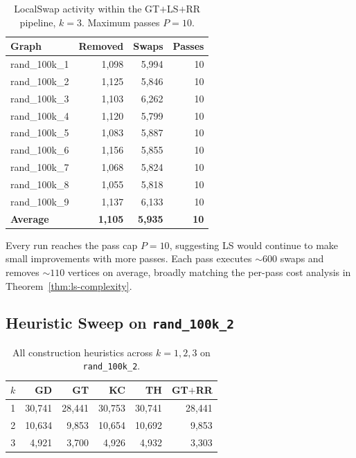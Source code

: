 \documentclass[11pt,a4paper]{article}
\begin{document}
\begin{table}[ht]
\centering
\caption{LocalSwap activity within the GT$+$LS$+$RR pipeline,
  $k=3$. Maximum passes $P=10$.}
\label{tab:per-graph-ls}
\begin{tabular}{lrrr}
\toprule
\textbf{Graph} & \textbf{Removed} & \textbf{Swaps} & \textbf{Passes}\\
\midrule
rand\_100k\_1 & 1{,}098 & 5{,}994 & 10\\
rand\_100k\_2 & 1{,}125 & 5{,}846 & 10\\
rand\_100k\_3 & 1{,}103 & 6{,}262 & 10\\
rand\_100k\_4 & 1{,}120 & 5{,}799 & 10\\
rand\_100k\_5 & 1{,}083 & 5{,}887 & 10\\
rand\_100k\_6 & 1{,}156 & 5{,}855 & 10\\
rand\_100k\_7 & 1{,}068 & 5{,}824 & 10\\
rand\_100k\_8 & 1{,}055 & 5{,}818 & 10\\
rand\_100k\_9 & 1{,}137 & 6{,}133 & 10\\
\midrule
\textbf{Average} & \textbf{1{,}105} & \textbf{5{,}935} & \textbf{10}\\
\bottomrule
\end{tabular}
\end{table}

Every run reaches the pass cap $P=10$, suggesting LS would continue to
make small improvements with more passes. Each pass executes
${\sim}600$ swaps and removes ${\sim}110$ vertices on average, broadly
matching the per-pass cost analysis in
Theorem~\ref{thm:ls-complexity}.


\subsection{Heuristic Sweep on \texttt{rand\_100k\_2}}

\begin{table}[ht]
\centering
\caption{All construction heuristics across $k=1,2,3$ on
  \texttt{rand\_100k\_2}.}
\label{tab:full-k}
\begin{tabular}{crrrrr}
\toprule
$k$ & \textbf{GD} & \textbf{GT} & \textbf{KC} & \textbf{TH}
   & \textbf{GT$+$RR}\\
\midrule
1 & 30{,}741 & 28{,}441 & 30{,}753 & 30{,}741 & 28{,}441 \\
2 & 10{,}634 &  9{,}853 & 10{,}654 & 10{,}692 &  9{,}853 \\
3 &  4{,}921 &  3{,}700 &  4{,}926 &  4{,}932 &  3{,}303 \\
\bottomrule
\end{tabular}
\end{table}
\end{document}
